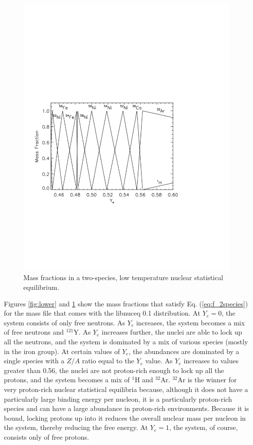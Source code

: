 \documentclass{article}    %
\begin{document}
\begin{figure}[htp]
\centering
\includegraphics[width=5in]{figures/upper}
\caption{Mass fractions in a two-species, low temperature nuclear
  statistical equilibrium.}
\label{fig:upper}
\end{figure}

Figures \ref{fig:lower} and \ref{fig:upper} show the mass fractions that
satisfy Eq. (\ref{eq:f_2species}) for the mass file that comes with the
libnuceq 0.1 distribution.  At $Y_e = 0$, the system consists of
only free neutrons.  As $Y_e$ increases, the system becomes a mix of
free neutrons and $^{121}$Y.  As $Y_e$ increases further, the nuclei are
able to lock up all the neutrons, and the system is dominated by a mix
of various species (mostly in the iron group).  At certain values of $Y_e$,
the abundances are dominated by a single species with a $Z/A$ ratio equal
to the $Y_e$ value.  As $Y_e$ increases to values greater than 0.56, the
nuclei are not proton-rich enough to lock up all the protons, and the system
becomes a mix of $^1$H and $^{32}$Ar.  $^{32}$Ar is the winner for very
proton-rich nuclear statistical equilibria because, although it does not
have a particularly large binding energy per nucleon, it is a
particularly proton-rich species and can have a large abundance in proton-rich
environments.  Because it is bound, locking protons up into it reduces the
overall nuclear mass per nucleon in the system, thereby reducing the free
energy.  At $Y_e = 1$, the system, of course, consists only of free protons.
\end{document}
